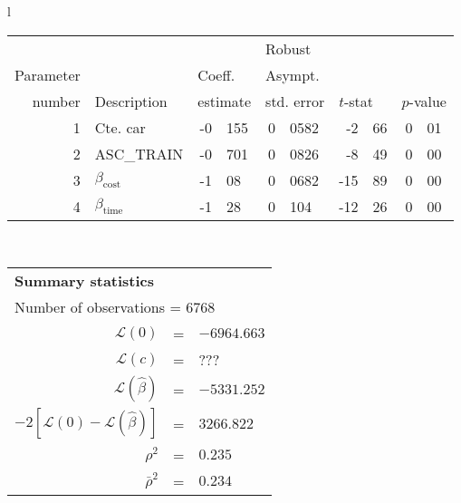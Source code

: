   \begin{tabular}{l}
\begin{tabular}{rlr@{.}lr@{.}lr@{.}lr@{.}l}
         &                       &   \multicolumn{2}{l}{}    & \multicolumn{2}{l}{Robust}  &     \multicolumn{4}{l}{}   \\
Parameter &                       &   \multicolumn{2}{l}{Coeff.}      & \multicolumn{2}{l}{Asympt.}  &     \multicolumn{4}{l}{}   \\
number &  Description                     &   \multicolumn{2}{l}{estimate}      & \multicolumn{2}{l}{std. error}  &   \multicolumn{2}{l}{$t$-stat}  &   \multicolumn{2}{l}{$p$-value}   \\

\hline

1 & Cte. car & -0&155 & 0&0582 & -2&66 & 0&01 \\
2 & ASC\_TRAIN & -0&701 & 0&0826 & -8&49 & 0&00 \\
3 & $\beta_\text{cost}$ & -1&08 & 0&0682 & -15&89 & 0&00 \\
4 & $\beta_\text{time}$ & -1&28 & 0&104 & -12&26 & 0&00 \\
\hline

\end{tabular}
\\
\begin{tabular}{rcl}
\multicolumn{3}{l}{\bf Summary statistics}\\
\multicolumn{3}{l}{ Number of observations = $6768$} \\
 $\mathcal{L}(0)$ &=&  $-6964.663$ \\
 $\mathcal{L}(c)$ &=& ???\\
 $\mathcal{L}(\hat{\beta})$ &=& $-5331.252 $  \\
 $-2[\mathcal{L}(0) -\mathcal{L}(\hat{\beta})]$ &=& $3266.822$ \\
    $\rho^2$ &=&   $0.235$ \\
    $\bar{\rho}^2$ &=&    $0.234$ \\
\end{tabular}
\end{tabular}

